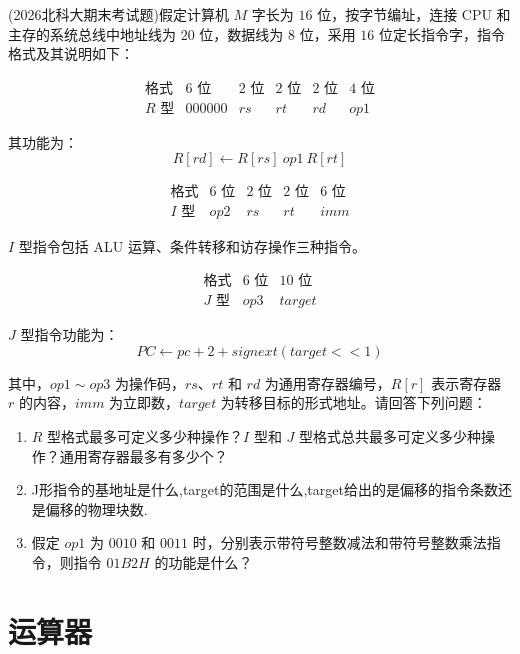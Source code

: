 \begin{question}

(2026北科大期末考试题)假定计算机 $M$ 字长为 $16$ 位，按字节编址，连接 CPU 和主存的系统总线中地址线为 $20$ 位，数据线为 $8$ 位，采用 $16$ 位定长指令字，指令格式及其说明如下：

\[
\begin{array}{c|c|c|c|c|c}
\text{格式} & 6\text{ 位} & 2\text{ 位} & 2\text{ 位} & 2\text{ 位} & 4\text{ 位} \\
\hline
R\text{ 型} & 000000 & rs & rt & rd & op1
\end{array}
\]

其功能为：
\[
R[rd] \leftarrow R[rs]\ op1\ R[rt]
\]

\[
\begin{array}{c|c|c|c|c}
\text{格式} & 6\text{ 位} & 2\text{ 位} & 2\text{ 位} & 6\text{ 位} \\
\hline
I\text{ 型} & op2 & rs & rt & imm
\end{array}
\]

$I$ 型指令包括 ALU 运算、条件转移和访存操作三种指令。

\[
\begin{array}{c|c|c}
\text{格式} & 6\text{ 位} & 10\text{ 位} \\
\hline
J\text{ 型} & op3 & target
\end{array}
\]

$J$ 型指令功能为：
\[
PC \leftarrow pc + 2 + signext(target<<1)
\]

其中，$op1 \sim op3$ 为操作码，$rs$、$rt$ 和 $rd$ 为通用寄存器编号，$R[r]$ 表示寄存器 $r$ 的内容，$imm$ 为立即数，$target$ 为转移目标的形式地址。请回答下列问题：

\begin{enumerate}
    \item $R$ 型格式最多可定义多少种操作？$I$ 型和 $J$ 型格式总共最多可定义多少种操作？通用寄存器最多有多少个？
    \item J形指令的基地址是什么,target的范围是什么,target给出的是偏移的指令条数还是偏移的物理块数.
    \item 假定 $op1$ 为 $0010$ 和 $0011$ 时，分别表示带符号整数减法和带符号整数乘法指令，则指令 $01B2H$ 的功能是什么？
\end{enumerate}
\end{question}




\newpage

\section{运算器}

